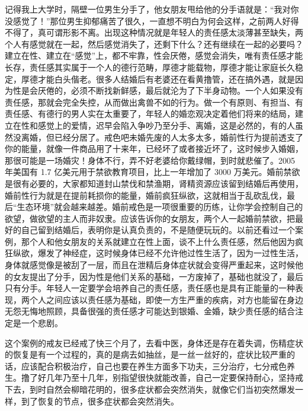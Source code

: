 \begin{case}
    记得我上大学时，隔壁一位男生分手了，他女朋友甩给他的分手语就是：“我对你没感觉了！”那位男生抑郁痛苦了很久，一直想不明白为何会这样，之前两人好得不得了，真可谓形影不离。出现这种情况就是年轻人的责任感太淡薄甚至缺失，两个人有感觉就在一起，然后感觉消失了，还剩下什么？还有继续在一起的必要吗？建立在性、建立在“感觉”上，都不牢靠，性会厌倦，感觉会消失，唯有责任感才能长存，责任感其实属于一个人的德行范畴，厚德才能载物，厚德才能让家庭长久稳定，厚德才能白头偕老。很多人结婚后有老婆还在看黄撸管，还在搞外遇，就是因为性是会厌倦的，必须不断找新鲜感，最后就沦为了下半身动物。一个人如果没有责任感，那就会完全失控，从而做出禽兽不如的行为。做一个有原则、有担当、有责任感、有德行的男人实在太重要了，年轻人的婚恋观决定着他们将来的结局，建立在性和感觉上的爱情，迟早会陷入争吵乃至分手、离婚，这是必然的，有的人虽然没离婚，但已经分居了。戒色吧未婚先废的人太多太多，婚前性行为提前透支了你的能量，就像一件商品用了十来年，已经坏了或者接近坏了，这时候步入婚姻，那很可能是一场婚灾！身体不行，弄不好老婆给你戴绿帽，到时就悲催了。2005 年美国有 1.7 亿美元用于禁欲教育项目，比上一年增加了 3000 万美元。婚前禁欲是很有必要的，大家都知道封山禁伐和禁渔期，肾精资源应该留到结婚后再使用，婚前性行为就是在提前耗损你的能量，婚前疯狂纵欲，这就相当于乱砍乱伐，最后“生态环境”就会越来越差。婚前戒色是一项很重要的历练，让你学会控制自己的欲望，做欲望的主人而非奴隶。应该告诉你的女朋友，两个人一起婚前禁欲，把最好的自己留到结婚后，表明你是认真负责的，不是随便玩玩的。以前还看过一个案例，那个人和他女朋友的关系就建立在性上面，谈不上什么责任感，然后他因为疯狂纵欲，爆发了神经症，这时候身体已经不允许他过性生活了，因为一过性生活，身体就感觉像是被刮了一层，而且在泄精后身体症状就会变得严重起来，这时候他的女友提出了分手，因为性是他们关系的基础，一方废掉了，基础也就没了，最后只有分手。年轻人一定要学会培养自己的责任感，责任感也是具有正能量的一种表现，两个人之间应该以责任感为基础，即使一方生严重的疾病，对方也能留在身边无怨无悔地照顾，具备很强的责任感才可能达到银婚、金婚，缺少责任感的结合注定是一个悲剧。

    这个案例的戒友已经戒了快三个月了，去看中医，身体还是存在着失调，伤精症状的恢复是有一个过程的，真的是病去如抽丝，是一丝一丝好的，症状比较严重的话，应该配合积极治疗，自己也要在养生方面多下功夫，三分治疗，七分戒色养生。撸了好几年乃至十几年，别指望很快就能改善，自己一定要保持耐心，坚持戒下去，到时自然会柳暗花明的，很多症状都会突然消失，就像它们当初突然爆发一样，到了恢复的节点，很多症状都会突然消失。
\end{case}

